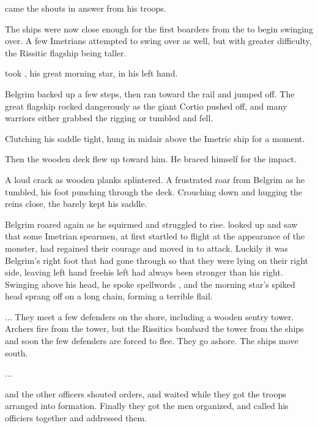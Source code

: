  came the shouts in answer from his troops. 

The ships were now close enough for the first boarders from the \MotherTiamat{} to begin swinging over. A few Imetrians attempted to swing over as well, but with greater difficulty, the Rissitic flagship being taller. 

\Narkiza{} took \Forshval{}, his great morning star, in his left hand. 



Belgrim backed up a few steps, then ran toward the rail and jumped off. The great flagship rocked dangerously as the giant Cortio pushed off, and many warriors either grabbed the rigging or tumbled and fell. 

Clutching his saddle tight, \Narkiza{} hung in midair above the Imetric ship for a moment. 

Then the wooden deck flew up toward him. He braced himself for the impact. 

A loud crack as wooden planks splintered. A frustrated roar from Belgrim as he tumbled, his foot punching through the deck. Crouching down and hugging the reins close, the \Ashenoch{} barely kept his saddle. 

Belgrim roared again as he squirmed and struggled to rise. \Narkiza{} looked up and saw that some Imetrian spearmen, at first startled to flight at the appearance of the monster, had regained their courage and moved in to attack. Luckily it was Belgrim's right foot that had gone through so that they were lying on their right side, leaving \Narkizaz{} left hand free\dash his left had always been stronger than his right. Swinging \Forshval{} above his head, he spoke spellwords , and the morning star's spiked head sprang off on a long chain, forming a terrible flail. 


...
\new
They meet a few defenders on the shore, including a wooden sentry tower. Archers fire from the tower, but the Rissitics bombard the tower from the ships and soon the few defenders are forced to flee. They go ashore. The ships move south. 

...

\new
{} \Kufur{} and the other officers shouted orders, and \Narkiza{} waited while they got the troops arranged into formation. Finally they got the men organized, and \Narkiza{} called his officiers together and addressed them.

